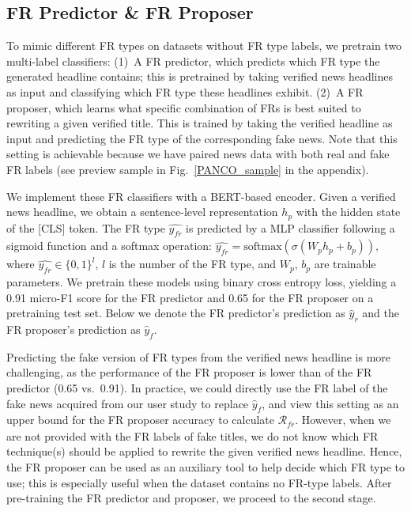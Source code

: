 \subsection{FR Predictor \& FR Proposer}
\label{subsec_fr_scorer}
To mimic different FR types on datasets without FR type
labels, we pretrain two multi-label classifiers: 
(1)~A FR predictor, which predicts which FR type the generated headline contains;
this is pretrained by taking verified news headlines as input and classifying
which FR type these headlines exhibit. 
(2)~A FR proposer, which learns what specific combination of FRs is best suited to
rewriting a given verified title.
This is trained by taking the verified headline as input and predicting the FR
type of the corresponding fake news.
Note that this setting is achievable because we have paired news data with both
real and fake FR labels (see preview sample in Fig.~\ref{PANCO_sample} in the
appendix).

We implement these FR classifiers with a BERT-based encoder. Given a verified
news headline, we obtain a sentence-level representation $h_p$ with the hidden
state of the [CLS] token. 
The FR type $\hat{y_{\mathit{fr}}}$ is predicted by a MLP classifier following
a sigmoid function and a softmax operation: 
$\label{eq_fr}
\hat{y_{\mathit{fr}}} = \mathrm{softmax}(\sigma(W_{p}h_{p}+b_{p})),$
where $\hat{y_{\mathit{fr}}} \in \{0,1\}^{l}$, $l$ is the number of the FR type, and $W_p$,
$b_{p}$ are trainable parameters. 
We pretrain these models using binary cross entropy loss, yielding a 0.91
micro-F1 score for the FR predictor and 0.65 for the FR proposer on a pretraining test
set. Below we denote the FR predictor's prediction as $\hat{y}_{r}$ and the FR proposer's prediction
as $\hat{y}_{f}$. 

Predicting the fake version of FR types from the verified news headline is more
challenging, as the performance of the FR proposer is lower than of the FR predictor (0.65
vs.\ 0.91).
In practice, we could directly use the FR label of the fake news acquired from
our user study to replace $\hat{y}_{f}$, and view this setting as an upper
bound for the FR proposer accuracy to calculate $\mathcal{R}_{\mathit{fr}}$.
However, when we are not provided with the FR labels of fake titles, we do not
know which FR technique(s) should be applied to rewrite the given
verified news headline. Hence, the FR proposer can be used as an auxiliary tool to
help decide which FR type to use; this is especially useful when the dataset
contains no FR-type labels.
After pre-training the FR predictor and proposer, we proceed to the second
stage. 

